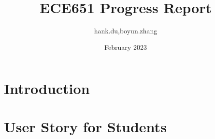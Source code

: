 \documentclass{article}
\title{ECE651 Progress Report}
\author{hank.du,boyun.zhang }
\date{February 2023}
\begin{document}
\maketitle

\section{Introduction}

\section{User Story for Students}
\end{document}
